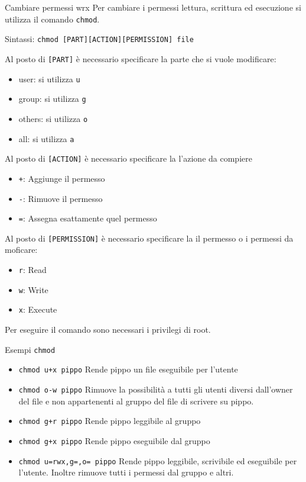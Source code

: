 \documentclass{beamer}
\begin{document}
\begin{frame}{Cambiare permessi wrx}
  Per cambiare i permessi lettura, scrittura ed esecuzione si utilizza il 
  comando \texttt{chmod}.\bigskip

  Sintassi: \texttt{chmod [PART][ACTION][PERMISSION] file}\bigskip

   {
    Al posto di \texttt{[PART]} è necessario specificare la 
    parte che si vuole modificare:
    \begin{itemize}
      \item user: si utilizza \texttt{u}
      \item group: si utilizza \texttt{g}
      \item others: si utilizza \texttt{o}
      \item all: si utilizza \texttt{a}
    \end{itemize}
  }

   {
    Al posto di \texttt{[ACTION]} è necessario specificare la 
    l'azione da compiere
    \begin{itemize}
      \item \texttt{+}: Aggiunge il permesso
      \item \texttt{-}: Rimuove il permesso
      \item \texttt{=}: Assegna esattamente quel permesso
    \end{itemize}
  }

   {
    Al posto di \texttt{[PERMISSION]} è necessario specificare la 
    il permesso o i permessi da moficare:
    \begin{itemize}
      \item \texttt{r}: Read
      \item \texttt{w}: Write
      \item \texttt{x}: Execute
    \end{itemize}
  }

  \bigskip Per eseguire il comando sono necessari i privilegi di root.
\end{frame}

\begin{frame}{Esempi \texttt{chmod}}
  \begin{itemize}
    \item \texttt{chmod u+x pippo} Rende pippo un file eseguibile per l'utente
    \item \texttt{chmod o-w pippo} Rimuove la possibilità a tutti gli utenti
      diversi dall'owner del file e non appartenenti al gruppo del file di 
      scrivere su pippo.
    \item \texttt{chmod g+r pippo} Rende pippo leggibile al gruppo
    \item \texttt{chmod g+x pippo} Rende pippo eseguibile dal gruppo
    \item \texttt{chmod u=rwx,g=,o= pippo} Rende pippo leggibile, scrivibile ed
      eseguibile per l'utente. Inoltre rimuove tutti i permessi dal gruppo e 
      altri.
  \end{itemize}
\end{frame}
\end{document}

